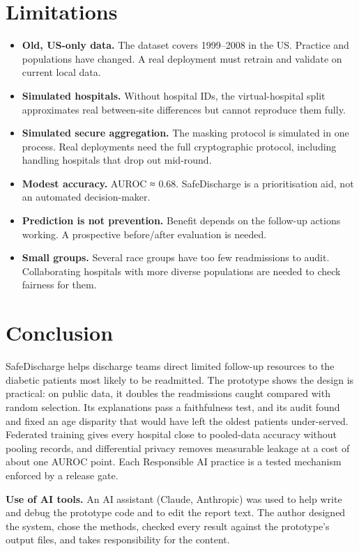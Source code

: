 \documentclass[10pt,a4paper]{article}
\begin{document}
\section{Limitations}\label{sec:5}
\begin{itemize}
\item \textbf{Old, US-only data.} The dataset covers 1999–2008 in the US. Practice and populations have changed. A real deployment must retrain and validate on current local data.
\item \textbf{Simulated hospitals.} Without hospital IDs, the virtual-hospital split approximates real between-site differences but cannot reproduce them fully.
\item \textbf{Simulated secure aggregation.} The masking protocol is simulated in one process. Real deployments need the full cryptographic protocol, including handling hospitals that drop out mid-round.
\item \textbf{Modest accuracy.} AUROC ≈ 0.68. SafeDischarge is a prioritisation aid, not an automated decision-maker.
\item \textbf{Prediction is not prevention.} Benefit depends on the follow-up actions working. A prospective before/after evaluation is needed.
\item \textbf{Small groups.} Several race groups have too few readmissions to audit. Collaborating hospitals with more diverse populations are needed to check fairness for them.
\end{itemize}

\section{Conclusion}\label{sec:6}

SafeDischarge helps discharge teams direct limited follow-up resources to the diabetic patients most likely to be readmitted. The prototype shows the design is practical: on public data, it doubles the readmissions caught compared with random selection. Its explanations pass a faithfulness test, and its audit found and fixed an age disparity that would have left the oldest patients under-served. Federated training gives every hospital close to pooled-data accuracy without pooling records, and differential privacy removes measurable leakage at a cost of about one AUROC point. Each Responsible AI practice is a tested mechanism enforced by a release gate.

\vspace{4pt}
\noindent\textbf{Use of AI tools.} An AI assistant (Claude, Anthropic) was used to help write and debug the prototype code and to edit the report text. The author designed the system, chose the methods, checked every result against the prototype's output files, and takes responsibility for the content.
\end{document}
